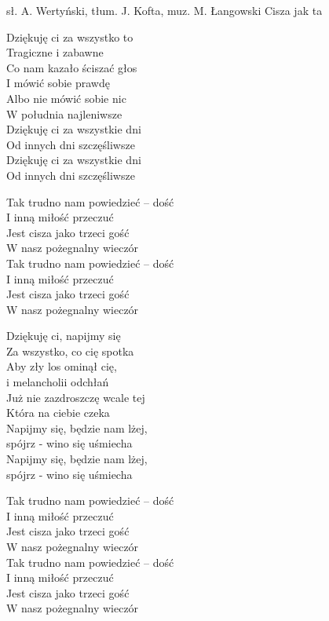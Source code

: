 {sł. A. Wertyński, tłum. J. Kofta, muz. M. Łangowski}
{Cisza jak ta}
\begin{text}
    \begin{tinyTwelve}
    \hfill\break
    \hfill\break
    \hfill\break
    \hfill\break
Dziękuję ci za wszystko to \\
Tragiczne i zabawne \\
Co nam kazało ściszać głos \\
I mówić sobie prawdę \\
Albo nie mówić sobie nic \\
W południa najleniwsze \\
Dziękuję ci za wszystkie dni \\
Od innych dni szczęśliwsze \\
Dziękuję ci za wszystkie dni \\
Od innych dni szczęśliwsze

\vin Tak trudno nam powiedzieć – dość \\
\vin I inną miłość przeczuć \\
\vin Jest cisza jako trzeci gość \\
\vin W nasz pożegnalny wieczór \\
\vin Tak trudno nam powiedzieć – dość \\
\vin I inną miłość przeczuć \\
\vin Jest cisza jako trzeci gość \\
\vin W nasz pożegnalny wieczór

    \hfill\break
    \hfill\break
Dziękuję ci, napijmy się \\
Za wszystko, co cię spotka \\
Aby zły los ominął cię, \\
i melancholii odchłań \\
Już nie zazdroszczę wcale tej \\
Która na ciebie czeka \\
Napijmy się, będzie nam lżej, \\
spójrz - wino się uśmiecha \\
Napijmy się, będzie nam lżej, \\
spójrz - wino się uśmiecha

\vin Tak trudno nam powiedzieć – dość \\
\vin I inną miłość przeczuć \\
\vin Jest cisza jako trzeci gość \\
\vin W nasz pożegnalny wieczór \\
\vin Tak trudno nam powiedzieć – dość \\
\vin I inną miłość przeczuć \\
\vin Jest cisza jako trzeci gość \\
\vin W nasz pożegnalny wieczór


\end{tinyTwelve}
\end{text}
